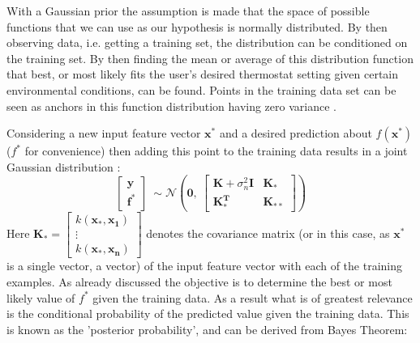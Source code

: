\documentclass[10.5pt,a4paper,twoside]{report}   %
\begin{document}
\noindent \textbf{}

With a Gaussian prior the assumption is made that the space of possible functions that we can use as our hypothesis is normally distributed.  By then observing data, i.e. getting a training set, the distribution can be conditioned on the training set. By then finding the mean or average of this distribution function that best, or most likely fits the user's desired thermostat setting given certain environmental conditions, can be found. Points in the training data set can be seen as anchors in this function distribution having zero variance \cite{MITGPRbook,GPMLDoc,scikitlearn,dukegpr}.

Considering a new input feature vector ${\boldsymbol{x}}^{\boldsymbol{*}}$ 
and a desired prediction about $f(\boldsymbol{x}^\ast )$ ($f^\ast$ for convenience) then adding this point to the training data results in a joint Gaussian distribution \cite{MITGPRbook}:
\begin{equation}
\left[ \begin{array}{c}
\boldsymbol{y} \\ 
{\boldsymbol{f}}^{\boldsymbol{\ast}} \end{array}
\right]\ \sim \mathcal{N}\left(\boldsymbol{0},\ \left[ \begin{array}{cc}
\boldsymbol{K}+{\sigma }^2_n\boldsymbol{I} & {\boldsymbol{K}}_{\boldsymbol{\ast}} \\ 
{\boldsymbol{K}}^{\boldsymbol{T}}_{\boldsymbol{\ast}} & {\boldsymbol{K}}_{\boldsymbol{\ast\ast}} \end{array}
\right]\right)
\end{equation}
Here $\boldsymbol{K}_{\boldsymbol{\ast}} = \begin{bmatrix} k\left(\boldsymbol{x}_{\boldsymbol{\ast}}, \boldsymbol{x}_{\boldsymbol{1}}\right)\\ \vdots\\ k\left(\boldsymbol{x}_{\boldsymbol{\ast}}, \boldsymbol{x}_{\boldsymbol{n}}\right)\end{bmatrix}$ denotes the covariance matrix (or in this case, as $\boldsymbol{x}^\ast$ is a single vector, a vector) of the input feature vector with each of the training examples. As already discussed the objective is to determine the best or most likely value of  $f^\ast$ given the training data. As a result what is of greatest relevance is the conditional probability of the predicted value given the training data. This is known as the 'posterior probability', and can be derived from Bayes Theorem:
\end{document}
